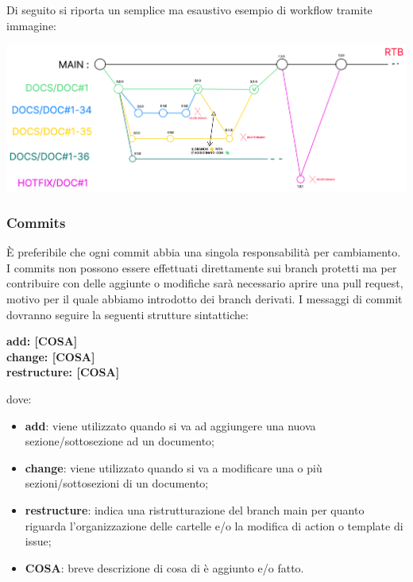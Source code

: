         Di seguito si riporta un semplice ma esaustivo esempio di workflow tramite immagine:
        \begin{center}
            \includegraphics[scale = 0.33]{template/images/workflow.png}
        \end{center}

        \subsubsection{Commits}\label{inf:comm}
        È preferibile che ogni commit abbia una singola responsabilità per cambiamento.
        I commits non possono essere effettuati direttamente sui branch protetti ma per contribuire con delle aggiunte o
        modifiche sarà necessario aprire una pull request, motivo per il quale abbiamo introdotto dei branch derivati.
        I messaggi di commit dovranno seguire la seguenti strutture sintattiche:
        \begin{center}
            \textbf{add: [COSA]\\
            change: [COSA]\\
            restructure: [COSA]}
        \end{center}
        dove: 
        \begin{itemize}
            \item \textbf{add}: viene utilizzato quando si va ad aggiungere una nuova sezione/sottosezione ad un documento;
            \item \textbf{change}: viene utilizzato quando si va a modificare una o più sezioni/sottosezioni di un documento;
            \item \textbf{restructure}: indica una ristrutturazione del branch main per quanto riguarda l'organizzazione delle cartelle e/o la modifica di action o template di issue;
            \item \textbf{COSA}: breve descrizione di cosa di è aggiunto e/o fatto.
        \end{itemize}

